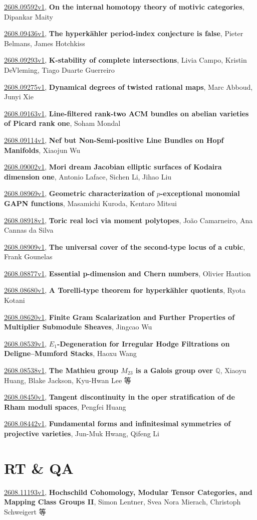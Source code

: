 \documentclass[9pt, a4paper]{article}
\theoremstyle{plain}
\theoremstyle{definition}
\theoremstyle{remark}
\newcommand{\arxiv}[3]{\href{https://arxiv.org/abs/#1}{#1}, \textbf{\textcolor{arxivblue}{#2}}, #3}
\begin{document}
\arxiv{2608.09592v1}{On the internal homotopy theory of motivic categories}{Dipankar Maity}

\arxiv{2608.09436v1}{The hyperkähler period-index conjecture is false}{Pieter Belmans, James Hotchkiss}

\arxiv{2608.09293v1}{K-stability of complete intersections}{Livia Campo, Kristin DeVleming, Tiago Duarte Guerreiro}

\arxiv{2608.09275v1}{Dynamical degrees of twisted rational maps}{Marc Abboud, Junyi Xie}

\arxiv{2608.09163v1}{Line-filtered rank-two ACM bundles on abelian varieties of Picard rank one}{Soham Mondal}

\arxiv{2608.09114v1}{Nef but Non-Semi-positive Line Bundles on Hopf Manifolds}{Xiaojun Wu}

\arxiv{2608.09002v1}{Mori dream Jacobian elliptic surfaces of Kodaira dimension one}{Antonio Laface, Sichen Li, Jihao Liu}

\arxiv{2608.08969v1}{Geometric characterization of $p$-exceptional monomial GAPN functions}{Masamichi Kuroda, Kentaro Mitsui}

\arxiv{2608.08918v1}{Toric real loci via moment polytopes}{João Camarneiro, Ana Cannas da Silva}

\arxiv{2608.08909v1}{The universal cover of the second-type locus of a cubic}{Frank Gounelas}

\arxiv{2608.08877v1}{Essential p-dimension and Chern numbers}{Olivier Haution}

\arxiv{2608.08680v1}{A Torelli-type theorem for hyperkähler quotients}{Ryota Kotani}

\arxiv{2608.08620v1}{Finite Gram Scalarization and Further Properties of Multiplier Submodule Sheaves}{Jingcao Wu}

\arxiv{2608.08539v1}{$E_1$-Degeneration for Irregular Hodge Filtrations on Deligne--Mumford Stacks}{Haoxu Wang}

\arxiv{2608.08538v1}{The Mathieu group $M_{23}$ is a Galois group over $\mathbb{Q}$}{Xiaoyu Huang, Blake Jackson, Kyu-Hwan Lee 等}

\arxiv{2608.08450v1}{Tangent discontinuity in the oper stratification of de Rham moduli spaces}{Pengfei Huang}

\arxiv{2608.08442v1}{Fundamental forms and infinitesimal symmetries of projective varieties}{Jun-Muk Hwang, Qifeng Li}


\section{RT \& QA}
\arxiv{2608.11193v1}{Hochschild Cohomology, Modular Tensor Categories, and Mapping Class Groups II}{Simon Lentner, Svea Nora Mierach, Christoph Schweigert 等}
\end{document}
